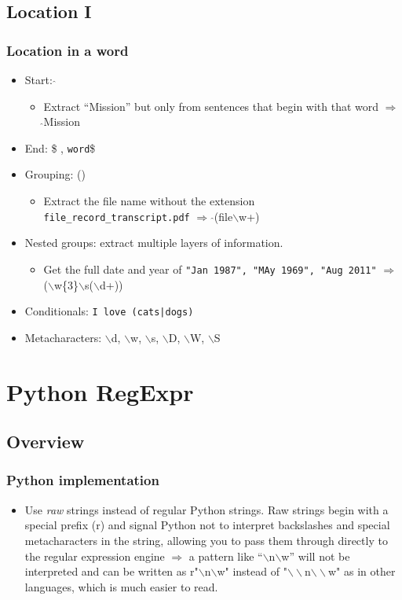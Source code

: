 \documentclass[xcolor=x11names,compress]{beamer}
\renewcommand{\(}{\begin{columns}}
\renewcommand{\)}{\end{columns}}
\newcommand{\<}[1]{\begin{column}{#1}}
\renewcommand{\>}{\end{column}}
\begin{document}
\subsection{Location I}
\begin{frame}[fragile]
\frametitle{Location in a word}
	\begin{itemize}
		\item \textcolor{myaqua}{Start}: $\hat{ }$
		\begin{itemize}
			\item Extract ``Mission'' but only from sentences that begin with that word $\Rightarrow$ $\hat{ }$Mission
		\end{itemize}
		\item \textcolor{myred}{End}: \$ , \texttt{word}\$
		\item Grouping: ()
		\begin{itemize}
			\item Extract the file name without the extension \texttt{file\_record\_transcript.pdf} \pause $\Rightarrow$ $\hat{ }$(file$\backslash$w+)
		\end{itemize}
		\item Nested groups: extract multiple layers of information.
		\begin{itemize}
			\item Get the full date and year of \texttt{"Jan 1987", "MAy 1969", "Aug 2011"} \pause $\Rightarrow$ ($\backslash$w\{3\}$\backslash$s($\backslash$d+))
		\end{itemize}
		\item Conditionals: \texttt{I love (cats|dogs)}
		\item Metacharacters: $\backslash$d, $\backslash$w, $\backslash$s, $\backslash$D, $\backslash$W, $\backslash$S
	\end{itemize}
\end{frame}

\section{Python RegExpr}
\subsection{Overview}
\begin{frame}[fragile]
\frametitle{Python implementation}
\begin{itemize}
	\item Use \emph{raw} strings instead of regular Python strings. Raw strings begin with a special prefix (r) and signal Python not to interpret backslashes and special metacharacters in the string, allowing you to pass them through directly to the regular expression engine $\Rightarrow$ a pattern like ``$\backslash$n$\backslash$w'' will not be interpreted and can be written as r"$\backslash$n$\backslash$w" instead of "$\backslash\backslash$n$\backslash\backslash$w" as in other languages, which is much easier to read.
\end{itemize}
\end{frame}
\end{document}
